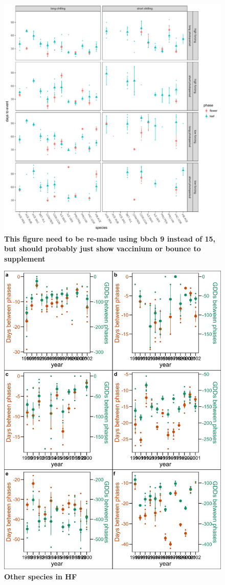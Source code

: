 \documentclass[11pt]{article}
\begin{document}
\begin{figure}[h!]
    \centering
 \includegraphics[width=\textwidth]{..//Plots/Flobuds_manuscript_figs/raw_plots_final.pdf}
    \caption{\textbf{This figure need to be re-made using bbch 9 instead of 15, but should probably just show vaccinium or bounce to supplement}}
    \label{fig:raw}
    \end{figure}

\begin{figure}[h!]
    \centering
 \includegraphics[width=\textwidth]{..//Plots/supp_field_sps.jpeg}
    \caption{\textbf{Other species in HF}}
    \label{fig:other}
    \end{figure}
\end{document}
